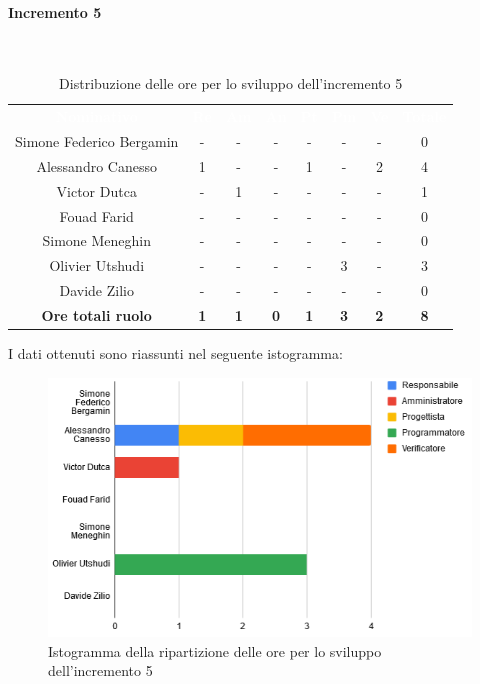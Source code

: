 \paragraph*{Incremento 5}\mbox{} \\
\begin{table}[H]
\centering\renewcommand{\arraystretch}{1.5}
\caption{Distribuzione delle ore per lo sviluppo dell'incremento 5}
\vspace{0.2cm}
\begin{tabular}{ c c c c c c c c }
\rowcolor{redafk}
\textcolor{white}{\textbf{Nominativo}} & \textcolor{white}{\textbf{Re}} &
\textcolor{white}{\textbf{Am}} & \textcolor{white}{\textbf{An}} &
\textcolor{white}{\textbf{Pt}} & \textcolor{white}{\textbf{Pm}} &
\textcolor{white}{\textbf{Ve}} & \textcolor{white}{\textbf{Totale}} \\
Simone Federico Bergamin & - & - & - & - & - & - & 0 \\
Alessandro Canesso & 1 & - & - & 1 & - & 2 & 4 \\
Victor Dutca & - & 1 & - & - & - & - & 1 \\
Fouad Farid & - & - & - & - & - & - & 0 \\
Simone Meneghin & - & - & - & - & - & - & 0 \\
Olivier Utshudi & - & - & - & - & 3 & - & 3 \\
Davide Zilio & - & - & - & - & - & - & 0 \\
\rowcolor{lastrowcolor}
\textbf{Ore totali ruolo} & \textbf{1} & \textbf{1} & \textbf{0} & \textbf{1} & \textbf{3} & \textbf{2} & \textbf{8} \\
\end{tabular}
\end{table}

I dati ottenuti sono riassunti nel seguente istogramma:
\begin{figure}[H]
\centering
\includegraphics[scale=0.60]{img/grafici/tabella_inc5.png}
\caption{Istogramma della ripartizione delle ore per lo sviluppo dell'incremento 5}
\end{figure}

